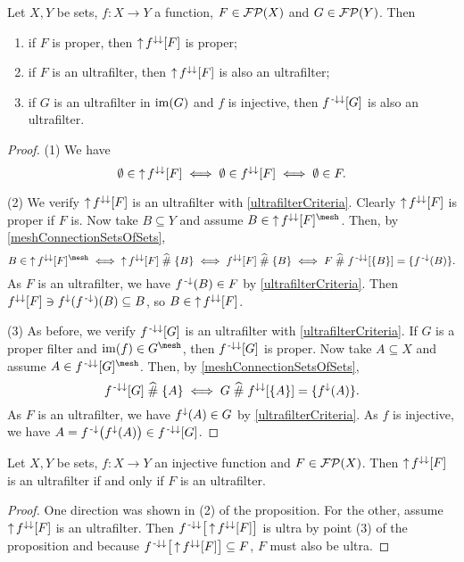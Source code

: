 \begin{proposition} \label{imageFilterProperties}
Let $X, Y$ be sets, $f: X\to Y$ a function, $F\in\operatorname{\mathcal{FP}}(X)$ and $G\in\operatorname{\mathcal{FP}}(Y)$. Then
\begin{enumerate}
\item if $F$ is proper, then $\operatorname{\uparrow} f^{\downarrow\downarrow}[F]$ is proper;
\item if $F$ is an ultrafilter, then $\operatorname{\uparrow} f^{\downarrow\downarrow}[F]$ is also an ultrafilter;
\item if $G$ is an ultrafilter in $\operatorname{im}(G)$ and $f$ is injective, then $f^{{\text{\hspace{0.15em}-}\downarrow}\downarrow}[G]$ is also an ultrafilter.
\end{enumerate}
\end{proposition}
\begin{proof}
(1) We have
\[ \emptyset \in \operatorname{\uparrow} f^{\downarrow\downarrow}[F] \iff \emptyset\in f^{\downarrow\downarrow}[F] \iff \emptyset\in F. \]

(2) We verify $\operatorname{\uparrow} f^{\downarrow\downarrow}[F]$ is an ultrafilter with \ref{ultrafilterCriteria}. Clearly $\operatorname{\uparrow} f^{\downarrow\downarrow}[F]$ is proper if $F$ is. Now take $B\subseteq Y$ and assume $B\in \upset f^{\imf\imf}[F]^\mesh$. Then, by \ref{meshConnectionSetsOfSets},
\[ B\in \upset f^{\imf\imf}[F]^\mesh \iff \upset f^{\imf\imf}[F] \amesh \{B\} \iff f^{\imf\imf}[F] \amesh \{B\} \iff F \amesh f^{\preimf\imf}[\{B\}] = \{f^\preimf(B)\}. \]
As $F$ is an ultrafilter, we have $f^{\text{\hspace{0.15em}-}\downarrow}(B) \in F$ by \ref{ultrafilterCriteria}. Then $f^{\downarrow\downarrow}[F] \ni f^\downarrow(f^{\text{\hspace{0.15em}-}\downarrow})(B) \subseteq B$, so $B\in \operatorname{\uparrow} f^{\downarrow\downarrow}[F]$.

(3) As before, we verify $f^{{\text{\hspace{0.15em}-}\downarrow}\downarrow}[G]$ is an ultrafilter with \ref{ultrafilterCriteria}. If $G$ is a proper filter and $\im(f)\in G^\mesh$, then $f^{{\text{\hspace{0.15em}-}\downarrow}\downarrow}[G]$ is proper. Now take $A\subseteq X$ and assume $A\in f^{\preimf\imf}[G]^\mesh$. Then, by \ref{meshConnectionSetsOfSets},
\[ f^{{\text{\hspace{0.15em}-}\downarrow}\downarrow}[G] \mathrel{\widehat{\#}} \{A\} \iff G \mathrel{\widehat{\#}} f^{\downarrow\downarrow}[\{A\}] = \{f^\downarrow(A)\}. \]
As $F$ is an ultrafilter, we have $f^\downarrow(A) \in G$ by \ref{ultrafilterCriteria}. As $f$ is injective, we have $A = f^{{\text{\hspace{0.15em}-}\downarrow}}\big(f^\downarrow(A)\big) \in f^{{\text{\hspace{0.15em}-}\downarrow}\downarrow}[G]$.
\end{proof}
\begin{corollary}
Let $X, Y$ be sets, $f: X\to Y$ an injective function and $F\in\operatorname{\mathcal{FP}}(X)$. Then $\operatorname{\uparrow} f^{\downarrow\downarrow}[F]$ is an ultrafilter \textup{if and only if} $F$ is an ultrafilter.
\end{corollary}
\begin{proof}
One direction was shown in (2) of the proposition. For the other, assume $\operatorname{\uparrow} f^{\downarrow\downarrow}[F]$ is an ultrafilter. Then $f^{{\text{\hspace{0.15em}-}\downarrow}\downarrow}\big[\operatorname{\uparrow} f^{\downarrow\downarrow}[F]\big]$ is ultra by point (3) of the proposition and because $f^{{\text{\hspace{0.15em}-}\downarrow}\downarrow}\big[\operatorname{\uparrow} f^{\downarrow\downarrow}[F]\big] \subseteq F$, $F$ must also be ultra.  
\end{proof}

